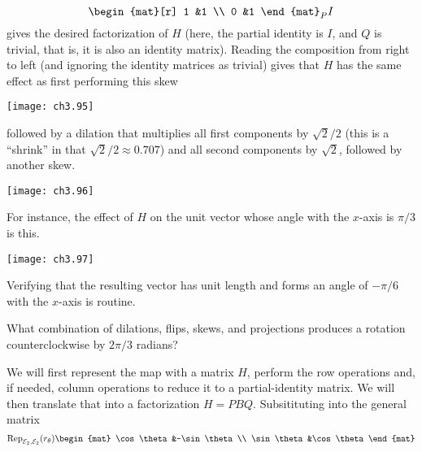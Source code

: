 \begin{exercises}
\begin{answer}
\begin{exparts}
\begin{equation*}
{\begin{mat}[r]
                1  &1 \\
                0  &1
              \end{mat}
             }_P
            I
          \end{equation*}
          gives the desired factorization of $H$ (here, the partial
          identity is $I$, and $Q$ is trivial, that is, it is also an identity
          matrix).
        \partsitem Reading the composition from right to left (and ignoring the
          identity matrices as trivial) gives that $H$ has the same
          effect as first performing this skew 
          \begin{center}
            \texttt{[image: ch3.95]}
         \end{center}
         followed by a dilation that multiplies all first components by 
         $\sqrt{2}/2$ (this is a ``shrink'' in that $\sqrt{2}/2\approx0.707$) 
         and all second components by $\sqrt{2}$,
         followed by another skew. 
          \begin{center}
            \texttt{[image: ch3.96]}
         \end{center}
         For instance, the effect of $H$ on the unit vector whose angle with
         the $x$-axis is $\pi/3$ is this.
          \begin{center}
            \texttt{[image: ch3.97]}
         \end{center}
         Verifying that the resulting vector has unit length and forms an
         angle of $-\pi/6$ with the $x$-axis is routine. 
      \end{exparts}
    \end{answer}
  \item 
    What combination of dilations, flips, skews, and projections
    produces a rotation counterclockwise by $2\pi/3$ radians?
    \begin{answer}
      We will first represent the map with a matrix $H$,
      perform the row operations and, if needed, column operations
      to reduce it to a partial-identity matrix.
      We will then translate that into a factorization $H=PBQ$.
      Subsitituting into the general matrix
          \begin{equation*}
            \rep{r_\theta}{\stdbasis_2,\stdbasis_2}
            \begin{mat}
              \cos\theta  &-\sin\theta  \\
              \sin\theta  &\cos\theta
            \end{mat}
          \end{equation*}

\end{answer}
\end{exercises}
